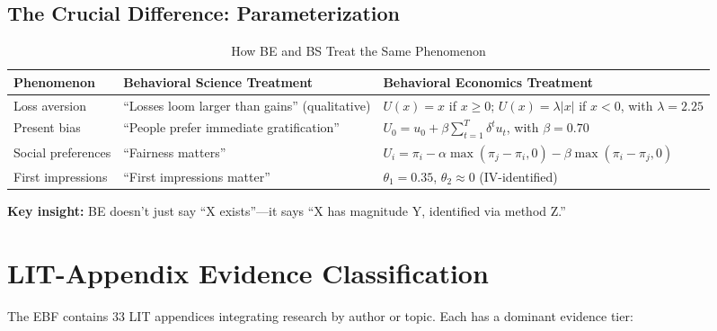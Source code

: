 \documentclass[11pt, a4paper]{article}
\begin{document}
\subsection{The Crucial Difference: Parameterization}

\begin{table}[htbp]
\centering
\caption{How BE and BS Treat the Same Phenomenon}
\label{tab:evd-be-bs-comparison}
\renewcommand{\arraystretch}{1.4}
\begin{tabular}{@{}p{3cm}p{5cm}p{5cm}@{}}
\toprule
\textbf{Phenomenon} & \textbf{Behavioral Science Treatment} & \textbf{Behavioral Economics Treatment} \\
\midrule
Loss aversion & ``Losses loom larger than gains'' (qualitative) & $U(x) = x$ if $x \geq 0$; $U(x) = \lambda |x|$ if $x < 0$, with $\lambda = 2.25$ \\
Present bias & ``People prefer immediate gratification'' & $U_0 = u_0 + \beta \sum_{t=1}^T \delta^t u_t$, with $\beta = 0.70$ \\
Social preferences & ``Fairness matters'' & $U_i = \pi_i - \alpha \max(\pi_j - \pi_i, 0) - \beta \max(\pi_i - \pi_j, 0)$ \\
First impressions & ``First impressions matter'' & $\theta_1 = 0.35$, $\theta_2 \approx 0$ (IV-identified) \\
\bottomrule
\end{tabular}
\end{table}

\textbf{Key insight:} BE doesn't just say ``X exists''---it says ``X has magnitude Y, identified via method Z.''


\section{LIT-Appendix Evidence Classification}
\label{sec:evd-lit-classification}

The EBF contains 33 LIT appendices integrating research by author or topic. Each has a dominant evidence tier:
\end{document}
